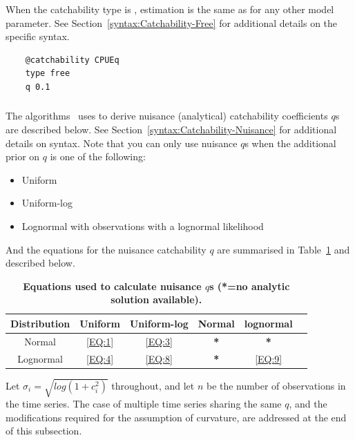 \subsubsection{ \label{subsec:free}}

When the catchability type is , estimation is the same as for any other model parameter. See Section~\ref{syntax:Catchability-Free} for additional details on the specific syntax.

{\small{\begin{verbatim}
	@catchability CPUEq
	type free
	q 0.1
\end{verbatim}}}

\subsubsection{ \label{subsec:nuisance}}
The algorithms \CNAME\ uses to derive nuisance (analytical) catchability coefficients $q$s are described below. See Section~\ref{syntax:Catchability-Nuisance} for additional details on syntax. Note that you can only use nuisance $q$s when the additional prior on $q$ is one of the following:

\begin{itemize}
	\item Uniform 
	\item Uniform-log
	\item Lognormal with observations with a lognormal likelihood
\end{itemize}

And the equations for the nuisance catchability $q$ are summarised in Table~\ref{tab:nus_overview} and described below.

\begin{table}[h!]
	\caption{\textbf{Equations used to calculate nuisance $q$s (*=no analytic solution available).}}\label{tab:nus_overview}
	\begin{tabular}{cccccc}
		Distribution  & Uniform & Uniform-log & Normal & lognormal\\
		\hline
		Normal &  \eqref{EQ:1} & \eqref{EQ:3} & \textbf{*} & \textbf{*} \\
		Lognormal  & \eqref{EQ:4} & \eqref{EQ:8} & \textbf{*} & \eqref{EQ:9} \\
	\end{tabular}
\end{table}

Let $\sigma_i = \sqrt{log(1 + c_i^2)}$ throughout, and let $n$ be the number of observations in the time series. The case of multiple time series sharing the same $q$, and the modifications required for the assumption of curvature, are addressed at the end of this subsection.

